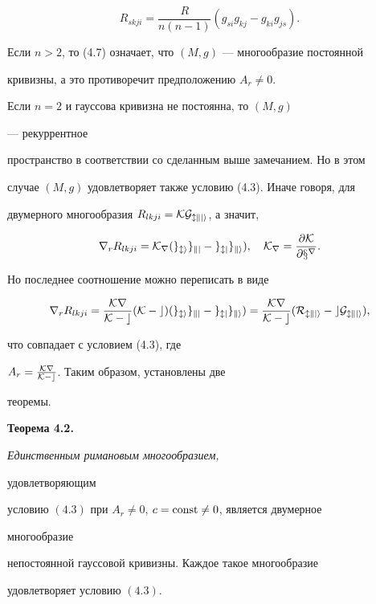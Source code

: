 \begin{equation}


R_{skji}=\frac{R}{n(n-1)}(g_{si}g_{kj}-g_{ki}g_{js}).\tag{4.7}


\end{equation}





Если $n>2$, то (4.7) означает, что $(M,g)$ --- многообразие постоянной


кривизны, а это противоречит предположению $A_r\ne 0$.





Если $n=2$ и гауссова кривизна не постоянна, то $(M,g)$


--- рекуррентное


пространство в соответствии со сделанным выше замечанием. Но в этом


случае $(M,g)$ удовлетворяет также условию (4.3). Иначе говоря, для


двумерного многообразия $R_{lkji}=\cal KG_{lkji}$, а значит,


$$


\nabla_r R_{lkji}=\cal K_r(g_{li}g_{kj}-g_{lj}g_{ki}),\quad


\cal K_r=\frac{\partial\cal K}{\partial x^r}.


$$


Но последнее соотношение можно переписать в виде


$$


\nabla_r R_{lkji}=\frac{\cal K r}{\cal K-c}


(\cal K-c)(g_{li}g_{kj}-g_{lj}g_{ki})=


\frac{\cal K r}{\cal K-c}(R_{lkji}-cG_{lkji}),


$$


что совпадает с условием (4.3), где


$A_r=\frac{\cal K r}{\cal K-c}$. Таким образом, установлены две


теоремы.


\medskip





{\bf Теорема 4.2.} {\it Единственным римановым многообразием,


удовлетворяющим


условию $(4.3)$ при $A_r\ne 0$, $c=\operatorname{const}\ne 0$, является двумерное


многообразие


непостоянной гауссовой кривизны. Каждое такое многообразие


удовлетворяет условию $(4.3)$.


}


